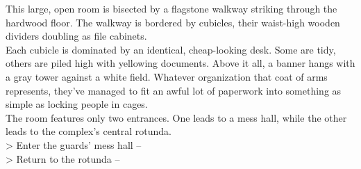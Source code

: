This large, open room is bisected by a flagstone walkway striking through the hardwood floor. The walkway is bordered by cubicles, their waist-high wooden dividers doubling as file cabinets.\\

Each cubicle is dominated by an identical, cheap-looking desk. Some are tidy, others are piled high with yellowing documents. Above it all, a banner hangs with a gray tower against a white field. Whatever organization that coat of arms represents, they've managed to fit an awful lot of paperwork into something as simple as locking people in cages.\\

The room features only two entrances. One leads to a mess hall, while the other leads to the complex's central rotunda.\\

> Enter the guards’ mess hall -- \\
> Return to the rotunda -- 